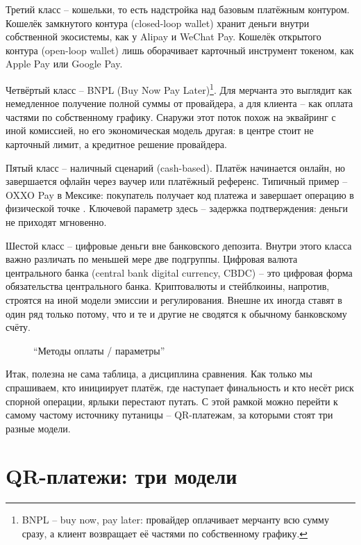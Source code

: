 Третий класс -- кошельки, то есть надстройка над базовым платёжным
контуром. Кошелёк замкнутого контура (closed-loop wallet) хранит деньги
внутри собственной экосистемы, как у Alipay и WeChat Pay. Кошелёк
открытого контура (open-loop wallet) лишь оборачивает карточный
инструмент токеном, как Apple Pay или Google Pay.

Четвёртый класс -- BNPL (Buy Now Pay Later)\footnote{BNPL -- buy now,
  pay later: провайдер оплачивает мерчанту всю сумму сразу, а клиент
  возвращает её частями по собственному графику.}. Для мерчанта это
выглядит как немедленное получение полной суммы от провайдера, а для
клиента -- как оплата частями по собственному графику. Снаружи этот
поток похож на эквайринг с иной комиссией, но его экономическая модель
другая: в центре стоит не карточный лимит, а кредитное решение
провайдера.

Пятый класс -- наличный сценарий (cash-based). Платёж начинается
онлайн, но завершается офлайн через ваучер или платёжный референс.
Типичный пример -- OXXO Pay в Мексике: покупатель получает код
платежа и завершает операцию в физической точке \cite{oxxo-pay}.
Ключевой параметр здесь -- задержка подтверждения: деньги не приходят
мгновенно.

Шестой класс -- цифровые деньги вне банковского депозита. Внутри этого
класса важно различать по меньшей мере две подгруппы. Цифровая валюта центрального
банка (central bank digital currency, CBDC) -- это цифровая форма
обязательства центрального банка. Криптовалюты и стейблкоины, напротив,
строятся на иной модели эмиссии и регулирования. Внешне их иногда
ставят в один ряд только потому, что и те и другие не сводятся
к обычному банковскому счёту.

\begin{figure}
  \centering
  \caption{\enquote{Методы оплаты / параметры}}
  \label{fig:alt-taxonomy-matrix}
\end{figure}

Итак, полезна не сама таблица, а дисциплина сравнения. Как только мы
спрашиваем, кто инициирует платёж, где наступает финальность и кто
несёт риск спорной операции, ярлыки перестают путать. С этой рамкой
можно перейти к самому частому источнику путаницы -- QR-платежам,
за которыми стоят три разные модели.

\section{QR-платежи: три модели}
\label{sec:alt-qr}

